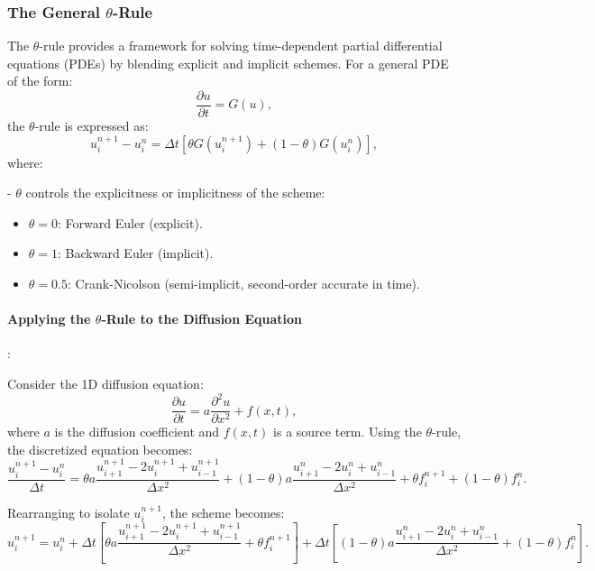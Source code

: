 \documentclass{article}
\begin{document}
		\subsubsection{The General \(\theta\)-Rule}
		
			The \(\theta\)-rule provides a framework for solving time-dependent partial differential equations (PDEs) by blending explicit and implicit schemes. For a general PDE of the form:
			\[
			\frac{\partial u}{\partial t} = G(u),
			\]
			the \(\theta\)-rule is expressed as:
			\[
			u_i^{n+1} - u_i^n = \Delta t \left[ \theta G(u_i^{n+1}) + (1 - \theta) G(u_i^n) \right],
			\]
			where:
			
			- \(\theta\) controls the explicitness or implicitness of the scheme:
			\begin{itemize}
				\item \(\theta = 0\): Forward Euler (explicit).
				\item \(\theta = 1\): Backward Euler (implicit).
				\item \(\theta = 0.5\): Crank-Nicolson (semi-implicit, second-order accurate in time).
			\end{itemize}
			
			\paragraph{Applying the \(\theta\)-Rule to the Diffusion Equation}:
			
			Consider the 1D diffusion equation:
			\[
			\frac{\partial u}{\partial t} = a \frac{\partial^2 u}{\partial x^2} + f(x, t),
			\]
			where \(a\) is the diffusion coefficient and \(f(x, t)\) is a source term. Using the \(\theta\)-rule, the discretized equation becomes:
			\[
			\frac{u_i^{n+1} - u_i^n}{\Delta t} = \theta a \frac{u_{i+1}^{n+1} - 2u_i^{n+1} + u_{i-1}^{n+1}}{\Delta x^2} + (1 - \theta) a \frac{u_{i+1}^n - 2u_i^n + u_{i-1}^n}{\Delta x^2} + \theta f_i^{n+1} + (1 - \theta) f_i^n.
			\]
			
			Rearranging to isolate \(u_i^{n+1}\), the scheme becomes:
			\[
			u_i^{n+1} = u_i^n + \Delta t \left[ \theta a \frac{u_{i+1}^{n+1} - 2u_i^{n+1} + u_{i-1}^{n+1}}{\Delta x^2} + \theta f_i^{n+1} \right] + \Delta t \left[ (1 - \theta) a \frac{u_{i+1}^n - 2u_i^n + u_{i-1}^n}{\Delta x^2} + (1 - \theta) f_i^n \right].
			\]
			
\end{document}
